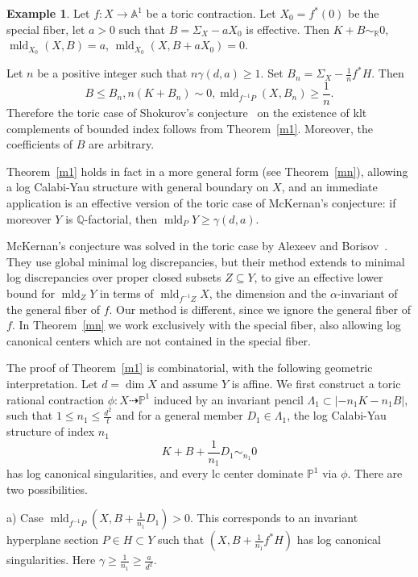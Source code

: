 \documentclass[12pt,twoside]{amsart}
\newcommand{\Q}{{\mathbb Q}}
\newcommand{\R}{{\mathbb R}}
\newcommand{\bP}{{\mathbb P}} %
\newcommand{\bA}{{\mathbb A}} %
\newcommand{\mld}{\operatorname{mld}}
\theoremstyle{plain}
\theoremstyle{definition}
\newtheorem{exmp}[thm]{Example}
\theoremstyle{remark}
\begin{document}
\begin{exmp}
	Let $f\colon X\to \bA^1$ be a toric contraction. Let $X_0=f^*(0)$ be the special fiber,
	let $a>0$ such that $B=\Sigma_X-a X_0$ is effective.
	Then $K+B\sim_\R 0$, $\mld_{X_0}(X,B)=a$, $\mld_{X_0}(X,B+a X_0)=0$.
\end{exmp}

Let $n$ be a positive integer such that $n\gamma(d,a)\ge 1$. Set $B_n=\Sigma_X-\frac{1}{n}f^*H$.
Then 
$$
B\le B_n, n(K+B_n)\sim 0, \mld_{f^{-1}P}(X,B_n)\ge \frac{1}{n}.
$$ 
Therefore the toric case of Shokurov's conjecture~\cite{Sho04} on the existence of klt complements of
bounded index follows from Theorem~\ref{m1}. Moreover, the coefficients of $B$ are arbitrary.

Theorem~\ref{m1} holds in fact in a more general form (see Theorem~\ref{mn}), 
allowing a log Calabi-Yau structure with general boundary on $X$, and an immediate 
application is an effective version of the toric case of McKernan's conjecture:
if moreover $Y$ is $\Q$-factorial, then $\mld_PY\ge \gamma(d,a)$. 

McKernan's conjecture was solved in the toric case by Alexeev and Borisov~\cite{AB12}.
They use global minimal log discrepancies, but their method extends to minimal log
discrepancies over proper closed subsets $Z\subseteq Y$, to give an 
effective lower bound for $\mld_Z Y$ in terms of $\mld_{f^{-1}Z}X$, the dimension and the
$\alpha$-invariant of the 
general fiber of $f$. Our method is different, since we ignore the 
general fiber of $f$. In Theorem~\ref{mn} we work exclusively with the 
special fiber, also allowing log canonical centers which are not contained in the special fiber.  

The proof of Theorem~\ref{m1} is combinatorial, with the following geometric interpretation.
Let $d=\dim X$ and assume $Y$ is affine. 
We first construct a toric rational contraction $\phi\colon X\dashrightarrow \bP^1$ 
induced by an invariant pencil $\Lambda_1\subset |-n_1K-n_1B|$, such that $1\le n_1\le \frac{d^2}{t}$
and for a general member $D_1\in \Lambda_1$, the log Calabi-Yau structure of index $n_1$
$$
K+B+\frac{1}{n_1}D_1\sim_{n_1}0
$$ 
has log canonical singularities, and every lc center dominate $\bP^1$ via $\phi$. 
There are two possibilities.

a) Case $\mld_{f^{-1}P}(X,B+\frac{1}{n_1}D_1)>0$. This corresponds to an invariant
hyperplane section $P\in H\subset Y$ such that $(X,B+\frac{1}{n_1}f^*H)$ has log canonical singularities.
Here $\gamma \ge \frac{1}{n_1}\ge \frac{a}{d^2}$.
\end{document}
